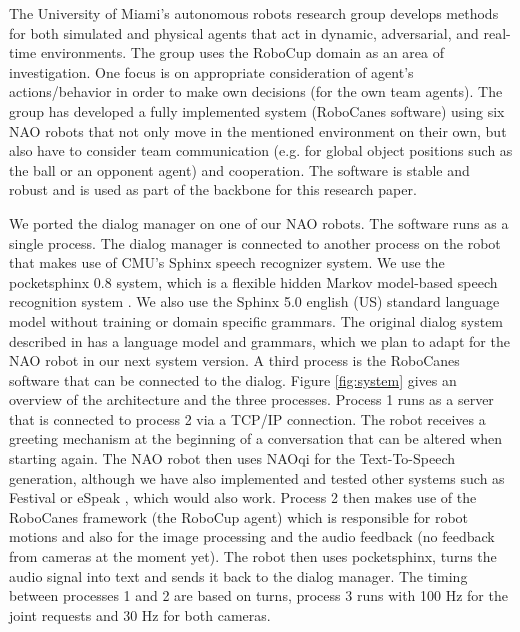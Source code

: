 \documentclass[letterpaper]{article}
\begin{document}
The University of Miami's autonomous robots research group develops methods for both simulated and
physical agents that act in dynamic, adversarial, and real-time environments. The group uses the
RoboCup domain as an area of investigation. One  focus is on appropriate consideration of agent's
actions/behavior in order to make own decisions (for the own team agents). The group has developed a
fully implemented system (RoboCanes software) using six NAO robots that not only move in the
mentioned environment on their own, but also have to consider team communication (e.g. for global
object positions such as the ball or an opponent agent) and cooperation. The software is stable and
robust and is used as part of the backbone for this research paper.

We ported the dialog manager on one of our NAO robots. The software runs as a single process. The
dialog manager is connected to another process on the robot that makes use of CMU's Sphinx speech
recognizer system. We use the pocketsphinx 0.8 system, which is a flexible hidden Markov model-based
speech recognition system \cite{huggins2006pocketsphinx}. We also use the Sphinx 5.0 english (US)
standard language model without training or domain specific grammars.  The original dialog system described in \cite{YASCLL14} has a language model and grammars, which we plan to  adapt for the NAO robot in our next system version. A third process is the
RoboCanes software that can be connected to the dialog. Figure \ref{fig:system} gives an overview of
the architecture and the three processes. Process 1 runs as a server that is connected to process 2
via a TCP/IP connection. The robot receives a greeting mechanism  at the beginning of a conversation
that can be altered when starting again. The NAO robot then uses NAOqi for the Text-To-Speech
generation, although we have also implemented and tested other systems such as Festival \cite{taylor1998architecture} or eSpeak \cite{eSpeak},
which would also work. Process 2 then makes use of the RoboCanes framework (the RoboCup agent) which
is responsible for robot motions and also for the image processing and the audio feedback (no 
feedback from cameras at the moment yet). The robot then uses pocketsphinx, turns the audio signal
into text and sends it back to the dialog manager. The timing between processes 1 and 2 are based on 
turns, process 3 runs with 100 Hz for the joint requests and 30 Hz for both cameras.
\end{document}
